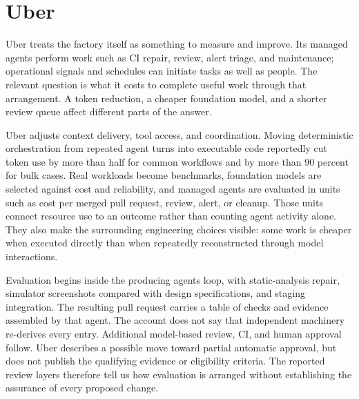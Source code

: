 \section{Uber}\label{heading:uber}


Uber treats the factory itself as something to measure and improve. Its managed agents perform work such as CI repair, review, alert triage, and maintenance; operational signals and schedules can initiate tasks as well as people\citep{medisetty2026sdlc}. The relevant question is what it costs to complete useful work through that arrangement. A token reduction, a cheaper foundation model, and a shorter review queue affect different parts of the answer.


Uber adjusts context delivery, tool access, and coordination. Moving deterministic orchestration from repeated agent turns into executable code reportedly cut token use by more than half for common workflows and by more than 90 percent for bulk cases. Real workloads become benchmarks, foundation models are selected against cost and reliability, and managed agents are evaluated in units such as cost per merged pull request, review, alert, or cleanup\citep{medisetty2026factory, medisetty2026sdlc}. Those units connect resource use to an outcome rather than counting agent activity alone. They also make the surrounding engineering choices visible: some work is cheaper when executed directly than when repeatedly reconstructed through model interactions.


Evaluation begins inside the producing agent\textquotesingle s loop, with static-analysis repair, simulator screenshots compared with design specifications, and staging integration. The resulting pull request carries a table of checks and evidence assembled by that agent. The account does not say that independent machinery re-derives every entry\citep{medisetty2026sdlc}. Additional model-based review, CI, and human approval follow. Uber describes a possible move toward partial automatic approval, but does not publish the qualifying evidence or eligibility criteria\citep{bond2026ureview}. The reported review layers therefore tell us how evaluation is arranged without establishing the assurance of every proposed change.

